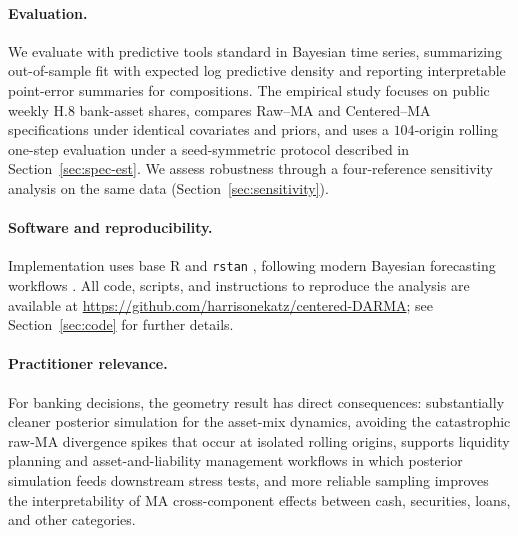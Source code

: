 \documentclass[12pt]{article}
\theoremstyle{remark}
\begin{document}
\paragraph{Evaluation.} We evaluate with predictive tools standard in Bayesian time series, summarizing out-of-sample fit with expected log predictive density \citep{vehtari2017practical, vehtari2012survey} and reporting interpretable point-error summaries for compositions. The empirical study focuses on public weekly H.8 bank-asset shares, compares Raw--MA and Centered--MA specifications under identical covariates and priors, and uses a $104$-origin rolling one-step evaluation under a seed-symmetric protocol described in Section~\ref{sec:spec-est}. We assess robustness through a four-reference sensitivity analysis on the same data (Section~\ref{sec:sensitivity}).

\paragraph{Software and reproducibility.} Implementation uses base R and \texttt{rstan} \citep{Rbase, Rstan}, following modern Bayesian forecasting workflows \citep{MTSPackage, hyndman2018forecasting}. All code, scripts, and instructions to reproduce the analysis are available at \url{https://github.com/harrisonekatz/centered-DARMA}; see Section~\ref{sec:code} for further details.

\paragraph{Practitioner relevance.} For banking decisions, the geometry result has direct consequences: substantially cleaner posterior simulation for the asset-mix dynamics, avoiding the catastrophic raw-MA divergence spikes that occur at isolated rolling origins, supports liquidity planning and asset-and-liability management workflows in which posterior simulation feeds downstream stress tests, and more reliable sampling improves the interpretability of MA cross-component effects between cash, securities, loans, and other categories.
\end{document}
